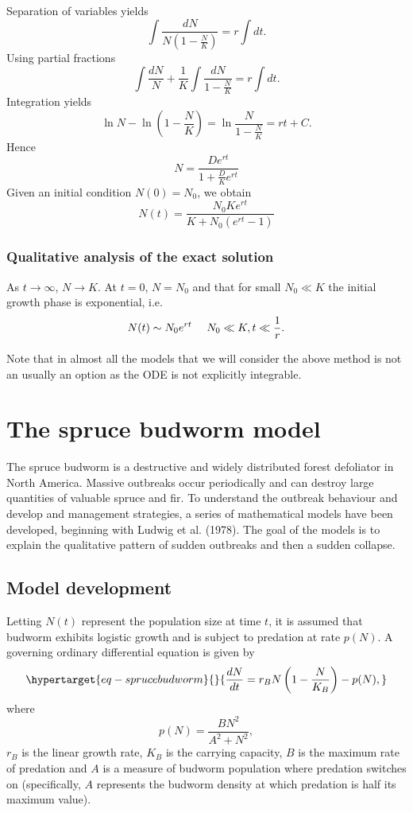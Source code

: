 \documentclass[
  letterpaper,
  DIV=11,
  numbers=noendperiod]{scrreprt}
\begin{document}
Separation of variables yields \[
\int\frac{ dN}{N(1-\frac{N}{K})}=r\int dt.
\] Using partial fractions \[
\int\frac{ dN}{N} + \frac{1}{K}\int\frac{ dN}{1-\frac{N}{K}}=r\int dt.
\] Integration yields \[
\ln N - \ln\left(1-\frac{N}{K}\right)= \ln \frac{N }{1-\frac{N}{K}} =  rt+C.
\] Hence \[
N=\frac{De^{rt}}{1+\frac{D}{K}e^{rt}}
\] Given an initial condition \(N(0)=N_0\), we obtain \[
N(t)=\frac{N_0K e^{rt}}{K+N_0(e^{rt}-1)}
\]

\hypertarget{qualitative-analysis-of-the-exact-solution}{%
\subsubsection{Qualitative analysis of the exact
solution}\label{qualitative-analysis-of-the-exact-solution}}

As \(t\rightarrow \infty\), \(N\rightarrow K\). At \(t=0\), \(N=N_0\)
and that for small \(N_0\ll K\) the initial growth phase is exponential,
i.e.~ \[
N(t)\sim N_0 e^{rt} \\ \ \ \ \ N_0\ll K, t\ll \frac{1}{r}.
\]

Note that in almost all the models that we will consider the above
method is not an usually an option as the ODE is not explicitly
integrable.

\hypertarget{the-spruce-budworm-model}{%
\section{The spruce budworm model}\label{the-spruce-budworm-model}}

The spruce budworm is a destructive and widely distributed forest
defoliator in North America. Massive outbreaks occur periodically and
can destroy large quantities of valuable spruce and fir. To understand
the outbreak behaviour and develop and management strategies, a series
of mathematical models have been developed, beginning with Ludwig et al.
(1978). The goal of the models is to explain the qualitative pattern of
sudden outbreaks and then a sudden collapse.

\hypertarget{model-development-2}{%
\subsection{Model development}\label{model-development-2}}

Letting \(N(t)\) represent the population size at time \(t\), it is
assumed that budworm exhibits logistic growth and is subject to
predation at rate \(p(N)\). A governing ordinary differential equation
is given by \begin{equation}\protect\hypertarget{eq-sprucebudworm}{}{
\frac{dN }{dt}= r_B N\left(1-\frac{N}{K_B}\right)-p(N),
}\label{eq-sprucebudworm}\end{equation} where \[
p(N) =\frac{B N^2}{A^2 +N^2},
\] \(r_B\) is the linear growth rate, \(K_B\) is the carrying capacity,
\(B\) is the maximum rate of predation and \(A\) is a measure of budworm
population where predation switches on (specifically, \(A\) represents
the budworm density at which predation is half its maximum value).
\end{document}
